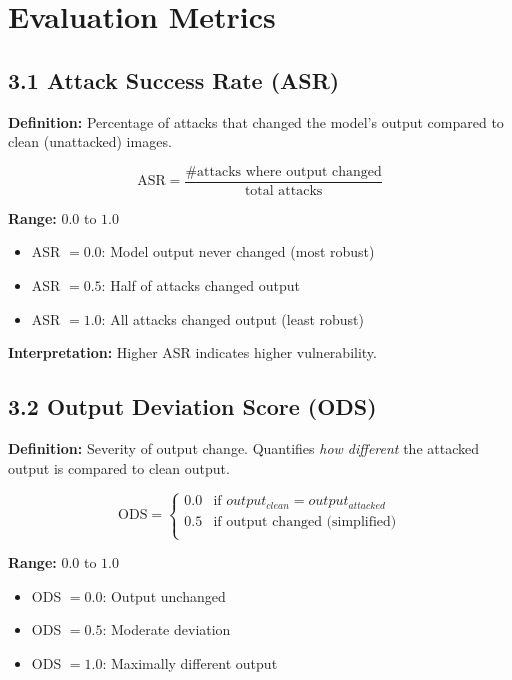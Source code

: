 \documentclass[12pt, a4paper]{article}
\begin{document}
\section{Evaluation Metrics}

\subsection{3.1 Attack Success Rate (ASR)}

\textbf{Definition:} Percentage of attacks that changed the model's output compared to clean (unattacked) images.

\[
\text{ASR} = \frac{\text{\# attacks where output changed}}{\text{total attacks}}
\]

\textbf{Range:} $0.0$ to $1.0$
\begin{itemize}
    \item ASR $= 0.0$: Model output never changed (most robust)
    \item ASR $= 0.5$: Half of attacks changed output
    \item ASR $= 1.0$: All attacks changed output (least robust)
\end{itemize}

\textbf{Interpretation:} Higher ASR indicates higher vulnerability.

\subsection{3.2 Output Deviation Score (ODS)}

\textbf{Definition:} Severity of output change. Quantifies \textit{how different} the attacked output is compared to clean output.

\[
\text{ODS} = \begin{cases} 
0.0 & \text{if }output_{clean} = output_{attacked} \\
0.5 & \text{if output changed (simplified)} \\
\end{cases}
\]

\textbf{Range:} $0.0$ to $1.0$
\begin{itemize}
    \item ODS $= 0.0$: Output unchanged
    \item ODS $= 0.5$: Moderate deviation
    \item ODS $= 1.0$: Maximally different output
\end{itemize}
\end{document}
